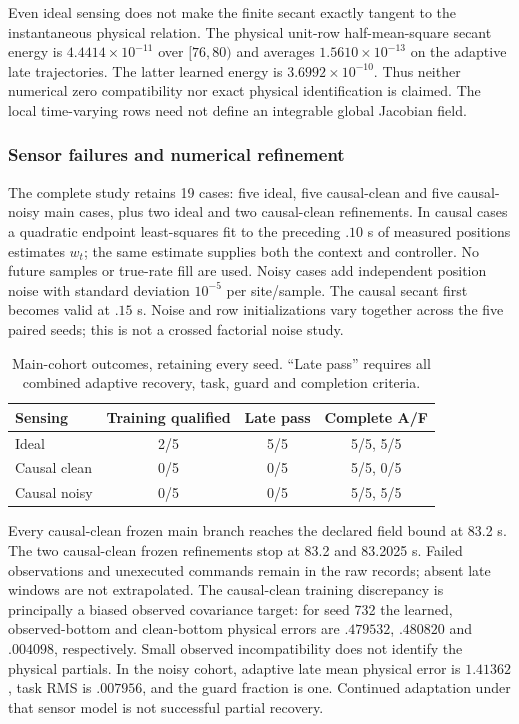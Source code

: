 \documentclass[journal]{IEEEtran}
\begin{document}
Even ideal sensing does not make the finite secant exactly tangent to the
instantaneous physical relation. The physical unit-row half-mean-square
secant energy is $4.4414\times10^{-11}$ over $[76,80)$ and averages
$1.5610\times10^{-13}$ on the adaptive late trajectories. The latter learned
energy is $3.6992\times10^{-10}$. Thus neither numerical zero compatibility
nor exact physical identification is claimed. The local time-varying rows
need not define an integrable global Jacobian field.

\subsubsection{Sensor failures and numerical refinement}
The complete study retains 19 cases: five ideal, five causal-clean and five
causal-noisy main cases, plus two ideal and two causal-clean refinements.
In causal cases a quadratic endpoint least-squares fit to the preceding $.10$
s of measured positions estimates $w_t$; the same estimate supplies both the
context and controller. No future samples or true-rate fill are used. Noisy
cases add independent position noise with standard deviation $10^{-5}$ per
site/sample. The causal secant first becomes valid at $.15$ s. Noise and row
initializations vary together across the five paired seeds; this is not a
crossed factorial noise study.

\begin{table}[t]
\centering
\caption{Main-cohort outcomes, retaining every seed. ``Late pass'' requires
all combined adaptive recovery, task, guard and completion criteria.}
\label{tab:direct_burgers_conditions}
\renewcommand{\arraystretch}{1.15}
\begin{tabular}{lccc}
\hline
Sensing & Training qualified & Late pass & Complete A/F\\
\hline
Ideal & 2/5 & 5/5 & 5/5, 5/5\\
Causal clean & 0/5 & 0/5 & 5/5, 0/5\\
Causal noisy & 0/5 & 0/5 & 5/5, 5/5\\
\hline
\end{tabular}
\end{table}

Every causal-clean frozen main branch reaches the declared field bound at
83.2 s. The two causal-clean frozen refinements stop at 83.2 and 83.2025 s.
Failed observations and unexecuted commands remain in the raw records; absent
late windows are not extrapolated. The causal-clean training discrepancy is
principally a biased observed covariance target: for seed 732 the learned,
observed-bottom and clean-bottom physical errors are $.479532$, $.480820$
and $.004098$, respectively. Small observed incompatibility does not identify
the physical partials. In the noisy cohort, adaptive late mean physical error
is $1.41362$, task RMS is $.007956$, and the guard fraction is one. Continued
adaptation under that sensor model is not successful partial recovery.
\end{document}
